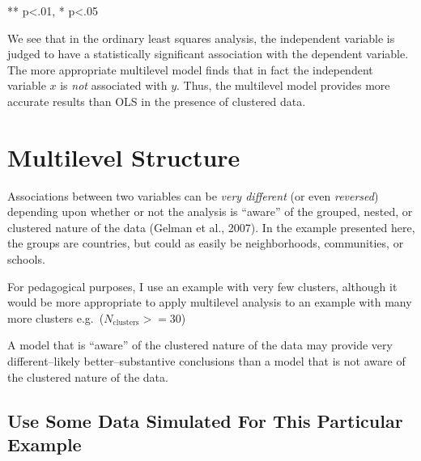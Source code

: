 \documentclass[
  letterpaper,
  DIV=11,
  numbers=noendperiod]{scrreprt}
\newenvironment{Shaded}{\begin{snugshade}}{\end{snugshade}}
\newcommand{\FunctionTok}[1]{\textcolor[rgb]{0.28,0.35,0.67}{#1}}
\newcommand{\NormalTok}[1]{\textcolor[rgb]{0.00,0.23,0.31}{#1}}
\newcommand{\OtherTok}[1]{\textcolor[rgb]{0.00,0.23,0.31}{#1}}
\newcommand{\SpecialCharTok}[1]{\textcolor[rgb]{0.37,0.37,0.37}{#1}}
\newcommand{\StringTok}[1]{\textcolor[rgb]{0.13,0.47,0.30}{#1}}
\begin{document}
** p\textless.01, * p\textless.05

We see that in the ordinary least squares analysis, the independent
variable is judged to have a statistically significant association with
the dependent variable. The more appropriate multilevel model finds that
in fact the independent variable \(x\) is \emph{not} associated with
\(y\). Thus, the multilevel model provides more accurate results than
OLS in the presence of clustered data.

\hypertarget{sec-multilevelstructure}{%
\section{Multilevel Structure}\label{sec-multilevelstructure}}

Associations between two variables can be \emph{very different} (or even
\emph{reversed}) depending upon whether or not the analysis is ``aware''
of the grouped, nested, or clustered nature of the data (Gelman et al.,
2007). In the example presented here, the groups are countries, but
could as easily be neighborhoods, communities, or schools.

For pedagogical purposes, I use an example with very few clusters,
although it would be more appropriate to apply multilevel analysis to an
example with many more clusters e.g.~(\(N_\text{clusters} >= 30\))

A model that is ``aware'' of the clustered nature of the data may
provide very different--likely better--substantive conclusions than a
model that is not aware of the clustered nature of the data.

\hypertarget{use-some-data-simulated-for-this-particular-example}{%
\subsection{Use Some Data Simulated For This Particular
Example}\label{use-some-data-simulated-for-this-particular-example}}

\begin{Shaded}
\end{Shaded}
\end{document}
